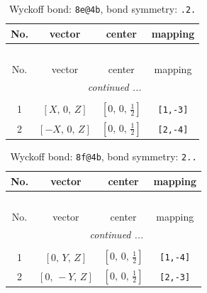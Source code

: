 \documentclass[fleqn,8pt]{jsarticle}
\begin{document}
\renewcommand{\arraystretch}{1.2}
\begin{longtable}{cccc}
\caption{Wyckoff bond: {\tt 8e@4b}, bond symmetry: {\tt .2.}}
 \\
 \hline \hline
No. & vector & center & mapping \\ \hline \endfirsthead

\multicolumn{3}{l}{\tablename\ \thetable{}} \\
 \hline \hline
No. & vector & center & mapping \\ \hline \endhead

 \hline \hline
\multicolumn{3}{r}{\footnotesize\it continued ...} \\ \endfoot

 \hline \hline
\multicolumn{3}{r}{} \\ \endlastfoot

1 & $\left[ X,\, 0,\, Z \right]$ & $\left[ 0,\, 0,\, \frac{1}{2} \right]$ & {\tt [1,-3]} \\ \hline
2 & $\left[ - X,\, 0,\, Z \right]$ & $\left[ 0,\, 0,\, \frac{1}{2} \right]$ & {\tt [2,-4]} \\
\end{longtable}
\renewcommand{\arraystretch}{1.2}
\begin{longtable}{cccc}
\caption{Wyckoff bond: {\tt 8f@4b}, bond symmetry: {\tt 2..}}
 \\
 \hline \hline
No. & vector & center & mapping \\ \hline \endfirsthead

\multicolumn{3}{l}{\tablename\ \thetable{}} \\
 \hline \hline
No. & vector & center & mapping \\ \hline \endhead

 \hline \hline
\multicolumn{3}{r}{\footnotesize\it continued ...} \\ \endfoot

 \hline \hline
\multicolumn{3}{r}{} \\ \endlastfoot

1 & $\left[ 0,\, Y,\, Z \right]$ & $\left[ 0,\, 0,\, \frac{1}{2} \right]$ & {\tt [1,-4]} \\ \hline
2 & $\left[ 0,\, - Y,\, Z \right]$ & $\left[ 0,\, 0,\, \frac{1}{2} \right]$ & {\tt [2,-3]} \\
\end{longtable}
\renewcommand{\arraystretch}{1.2}
\end{document}
